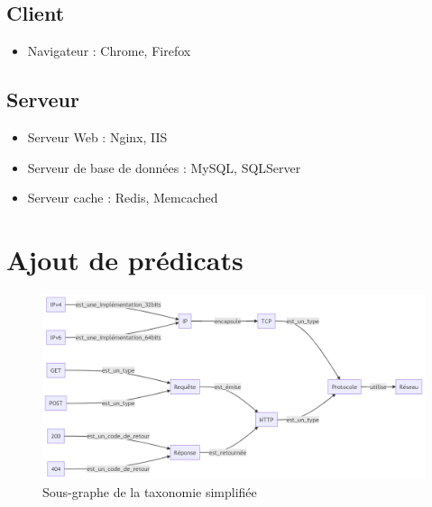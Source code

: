 \documentclass{article}
\begin{document}
\subsection{Client}
\begin{itemize}
    \item Navigateur : Chrome, Firefox
\end{itemize}

\subsection{Serveur}
\begin{itemize}
    \item Serveur Web : Nginx, IIS
    \item Serveur de base de données : MySQL, SQLServer
    \item Serveur cache : Redis, Memcached
\end{itemize}

\section{Ajout de prédicats}
\begin{figure}[ht]
    \centering
    \includegraphics[width=\textwidth, height=\textheight, keepaspectratio]{../images/mermaid_v2_sub.png}
    \caption{Sous-graphe de la taxonomie simplifiée}
    \label{fig:Sous-graphe référençant les prédicats}
\end{figure}

\newpage
\end{document}
